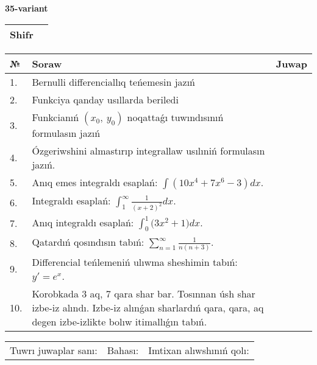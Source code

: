 \documentclass{article}
\begin{document}
  \egroup
  
  \newpage
  
  
  \textbf{35-variant}\\
  
  \bgroup
  \def\arraystretch{1.6} %
  
  \begin{tabular}{|m{5.7cm}|m{9.5cm}|}
  \hline
  Shifr & \\
  \hline
  \end{tabular}
  
  \vspace{1cm}
  
  \begin{tabular}{|m{0.7cm}|m{10cm}|m{4cm}|}
  \hline
  № & Soraw & Juwap \\
  \hline
  1. & Bernulli differenciallıq teńemesin jazıń &  \\
  \hline
  2. & Funkciya qanday usıllarda beriledi &  \\
  \hline
  3. & Funkcianıń \((x_{0},\ y_{0})\) noqattaǵı tuwındısınıń formulasın jazıń &  \\
  \hline
  4. & Ózgeriwshini almastırıp integrallaw usılıniń formulasın jazıń. &  \\
  \hline
  5. & Anıq emes integraldı esaplań: \(\int{\left( 10x^{4} + 7x^{6} - 3 \right)dx}\). &  \\
  \hline
  6. & Integraldı esaplań: \(\int_{1}^{\infty}{\frac{1}{(x + 2)^2 }dx}\). &  \\
  \hline
  7. & Anıq integraldı esaplań: \(\int_{0}^{1}{(3x^2 } + 1)dx\). &  \\
  \hline
  8. & Qatardıń qosındısın tabıń: \(\sum_{n = 1}^{\infty}\frac{1}{n(n + 3)}\). &  \\
  \hline
  9. & Differencial teńlemeniń ulıwma sheshimin tabıń: \(y' = e^{x}\). &  \\
  \hline
  10. & Korobkada 3 aq, 7 qara shar bar. Tosınnan úsh shar izbe-iz alındı. Izbe-iz alınǵan sharlardıń qara, qara, aq degen izbe-izlikte bolıw itimallıǵın tabıń. &  \\
  \hline
  \end{tabular}
  
  \vspace{1cm}
  
  \begin{tabular}{lll}
  Tuwrı juwaplar sanı: \underline{\hspace{1.5cm}} & 
  Bahası: \underline{\hspace{1.5cm}} & 
  Imtixan alıwshınıń qolı: \underline{\hspace{2cm}} \\
  \end{tabular}
  
\end{document}
